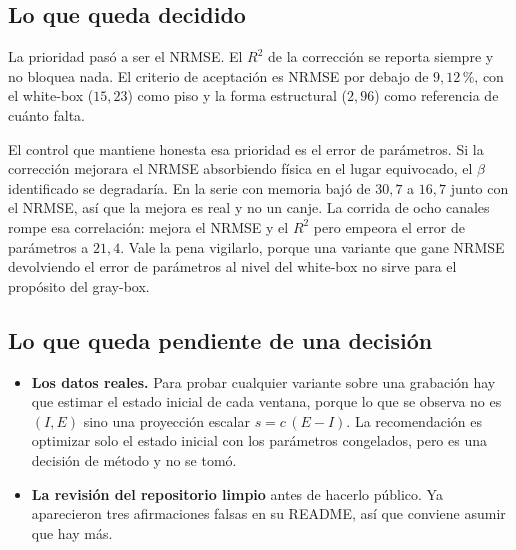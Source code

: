 \documentclass[11pt,a4paper]{article}
\begin{document}
\subsection{Lo que queda decidido}

La prioridad pasó a ser el NRMSE. El $R^2$ de la corrección se reporta siempre y
no bloquea nada. El criterio de aceptación es NRMSE por debajo de $9{,}12\,\%$,
con el white-box ($15{,}23$) como piso y la forma estructural ($2{,}96$) como
referencia de cuánto falta.

El control que mantiene honesta esa prioridad es el error de parámetros. Si la
corrección mejorara el NRMSE absorbiendo física en el lugar equivocado, el
$\beta$ identificado se degradaría. En la serie con memoria bajó de $30{,}7$ a
$16{,}7$ junto con el NRMSE, así que la mejora es real y no un canje. La corrida
de ocho canales rompe esa correlación: mejora el NRMSE y el $R^2$ pero empeora
el error de parámetros a $21{,}4$. Vale la pena vigilarlo, porque una variante
que gane NRMSE devolviendo el error de parámetros al nivel del white-box no
sirve para el propósito del gray-box.

\subsection{Lo que queda pendiente de una decisión}

\begin{itemize}
\item \textbf{Los datos reales.} Para probar cualquier variante sobre una
  grabación hay que estimar el estado inicial de cada ventana, porque lo que se
  observa no es $(I,E)$ sino una proyección escalar $s = c\,(E - I)$. La
  recomendación es optimizar solo el estado inicial con los parámetros
  congelados, pero es una decisión de método y no se tomó.
\item \textbf{La revisión del repositorio limpio} antes de hacerlo público. Ya
  aparecieron tres afirmaciones falsas en su README, así que conviene asumir que
  hay más.
\end{itemize}
\end{document}
